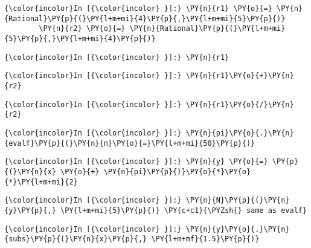     \begin{Verbatim}[commandchars=\\\{\}]
{\color{incolor}In [{\color{incolor} }]:} \PY{n}{r1} \PY{o}{=} \PY{n}{Rational}\PY{p}{(}\PY{l+m+mi}{4}\PY{p}{,}\PY{l+m+mi}{5}\PY{p}{)}
        \PY{n}{r2} \PY{o}{=} \PY{n}{Rational}\PY{p}{(}\PY{l+m+mi}{5}\PY{p}{,}\PY{l+m+mi}{4}\PY{p}{)}
\end{Verbatim}

    \begin{Verbatim}[commandchars=\\\{\}]
{\color{incolor}In [{\color{incolor} }]:} \PY{n}{r1}
\end{Verbatim}

    \begin{Verbatim}[commandchars=\\\{\}]
{\color{incolor}In [{\color{incolor} }]:} \PY{n}{r1}\PY{o}{+}\PY{n}{r2}
\end{Verbatim}

    \begin{Verbatim}[commandchars=\\\{\}]
{\color{incolor}In [{\color{incolor} }]:} \PY{n}{r1}\PY{o}{/}\PY{n}{r2}
\end{Verbatim}





    \begin{Verbatim}[commandchars=\\\{\}]
{\color{incolor}In [{\color{incolor} }]:} \PY{n}{pi}\PY{o}{.}\PY{n}{evalf}\PY{p}{(}\PY{n}{n}\PY{o}{=}\PY{l+m+mi}{50}\PY{p}{)}
\end{Verbatim}

    \begin{Verbatim}[commandchars=\\\{\}]
{\color{incolor}In [{\color{incolor} }]:} \PY{n}{y} \PY{o}{=} \PY{p}{(}\PY{n}{x} \PY{o}{+} \PY{n}{pi}\PY{p}{)}\PY{o}{*}\PY{o}{*}\PY{l+m+mi}{2}
\end{Verbatim}

    \begin{Verbatim}[commandchars=\\\{\}]
{\color{incolor}In [{\color{incolor} }]:} \PY{n}{N}\PY{p}{(}\PY{n}{y}\PY{p}{,} \PY{l+m+mi}{5}\PY{p}{)} \PY{c+c1}{\PYZsh{} same as evalf}
\end{Verbatim}



    \begin{Verbatim}[commandchars=\\\{\}]
{\color{incolor}In [{\color{incolor} }]:} \PY{n}{y}\PY{o}{.}\PY{n}{subs}\PY{p}{(}\PY{n}{x}\PY{p}{,} \PY{l+m+mf}{1.5}\PY{p}{)}
\end{Verbatim}


